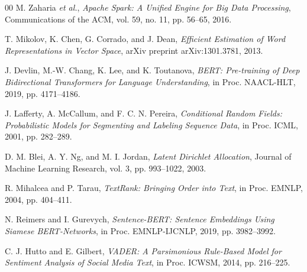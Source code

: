\documentclass[conference]{IEEEtran}
\begin{document}
\begin{thebibliography}{00}
M. Zaharia \emph{et al.}, \emph{Apache Spark: A Unified Engine for Big Data Processing}, Communications of the ACM, vol. 59, no. 11, pp. 56--65, 2016.

T. Mikolov, K. Chen, G. Corrado, and J. Dean, \emph{Efficient Estimation of Word Representations in Vector Space}, arXiv preprint arXiv:1301.3781, 2013.

J. Devlin, M.-W. Chang, K. Lee, and K. Toutanova, \emph{BERT: Pre-training of Deep Bidirectional Transformers for Language Understanding}, in Proc. NAACL-HLT, 2019, pp. 4171--4186.

J. Lafferty, A. McCallum, and F. C. N. Pereira, \emph{Conditional Random Fields: Probabilistic Models for Segmenting and Labeling Sequence Data}, in Proc. ICML, 2001, pp. 282--289.

D. M. Blei, A. Y. Ng, and M. I. Jordan, \emph{Latent Dirichlet Allocation}, Journal of Machine Learning Research, vol. 3, pp. 993--1022, 2003.

R. Mihalcea and P. Tarau, \emph{TextRank: Bringing Order into Text}, in Proc. EMNLP, 2004, pp. 404--411.

N. Reimers and I. Gurevych, \emph{Sentence-BERT: Sentence Embeddings Using Siamese BERT-Networks}, in Proc. EMNLP-IJCNLP, 2019, pp. 3982--3992.

C. J. Hutto and E. Gilbert, \emph{VADER: A Parsimonious Rule-Based Model for Sentiment Analysis of Social Media Text}, in Proc. ICWSM, 2014, pp. 216--225.
\end{thebibliography}
\end{document}

